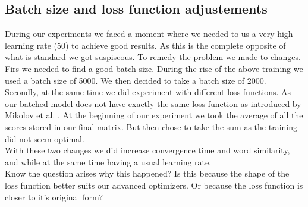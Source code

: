 \subsection{Batch size and loss function adjustements}\label{ssec:bs_lf}
During our experiments we faced a moment where we needed to us a very high learning rate (50) to achieve good results. As this is the complete opposite of what is standard we got suspiscous. To remedy the problem we made to changes. 
Firs we needed to find a good batch size. During the rise of the above training we used a batch size of 5000. We then decided to take a batch size of 2000.\\
 Secondly, at the same time we did experiment with different loss functions. As our batched model does not have exactly the same loss function as introduced by Mikolov et al. \cite{mikolov}. At the beginning of our experiment we took the average of all the scores stored in our final matrix. But then chose to take the sum as the training did not seem optimal.\\ 
 With these two changes we did increase convergence time and word similarity, and while at the same time having a usual learning rate. \\
 Know the question arises why this happened? Is this because the shape of the loss function better suits our advanced optimizers. Or because the loss function is closer to it's original form?

